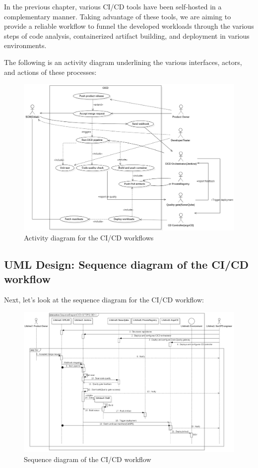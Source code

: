 In the previous chapter, various CI/CD tools have been self-hosted in a complementary manner. Taking advantage of these tools, we are aiming to provide a reliable workflow to funnel the developed workloads through the various steps of code analysis, containerized artifact building, and deployment in various environments.  

 

The following is an activity diagram underlining the various interfaces, actors, and actions of these processes: 

\begin{figure}[H]\centering
\includegraphics[width=1.0\textwidth,angle=00]{assets/f45.png}
\caption{ Activity diagram for the CI/CD workflows}
\label{fig:Activity diagram for the CI/CD workflows}
\end{figure}

\subsection{UML Design: Sequence diagram of the CI/CD workflow }

Next, let’s look at the sequence diagram for the CI/CD workflow: 
\begin{figure}[H]\centering
\includegraphics[width=1.0\textwidth,angle=00]{assets/f46.png}
\caption{ Sequence diagram of the CI/CD workflow}
\label{fig:sequence diagram of the CI/CD workflow}
\end{figure}

